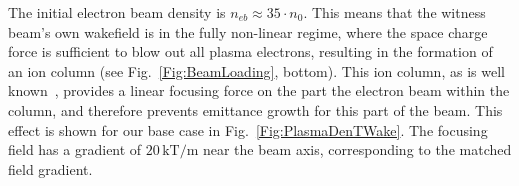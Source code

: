 \documentclass[aps,prstab,reprint,amsmath,amssymb,groupedaddress]{revtex4-1}
\newcommand{\unit}[1]{\,\mathrm{#1}}
\begin{document}
The initial electron beam density is $n_{eb} \approx 35\cdot n_{0}$. This means that the witness beam's own wakefield
is in the fully non-linear regime, where the space charge force is sufficient to blow out all plasma electrons,
resulting in the formation of an ion column (see Fig.~\ref{Fig:BeamLoading}, bottom). This ion column, as is well
known~\cite{rosenzweig:1991}, provides a linear focusing force on the part the electron beam within the column, and
therefore prevents emittance growth for this part of the beam. This effect is shown for our base case in
Fig.~\ref{Fig:PlasmaDenTWake}. The focusing field has a gradient of $20\unit{kT/m}$ near the beam axis, corresponding to
the matched field gradient.


\end{document}
